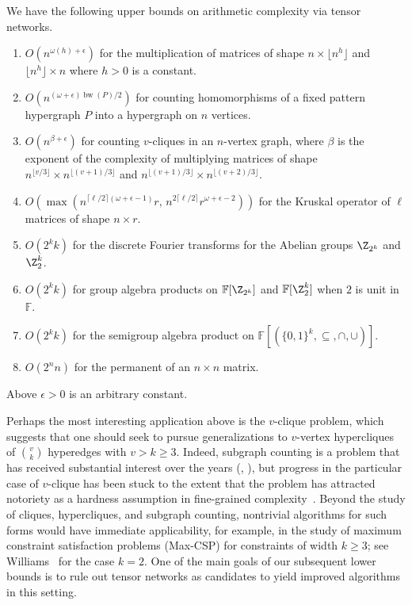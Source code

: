 \documentclass{toc}
\DeclareMathOperator{\bw}{bw}
\newcommand{\F}{\ensuremath{\mathbb{F}}}
\begin{document}
\begin{theorem}
  \label{thm:upper bounds}
  We have the following upper bounds on arithmetic complexity via tensor
networks. %
  \begin{enumerate}
  \item $O(n^{\omega(h) + \epsilon})$ for the multiplication of matrices of shape $n \times \lfloor n^h \rfloor$ and $\lfloor n^h \rfloor \times n$
where $h > 0$ is a constant. %
%
  \item $O(n^{(\omega+\epsilon) \bw(P)/2})$ for counting homomorphisms of a fixed pattern hypergraph $P$ into a hypergraph on $n$ vertices.
  \item $O(n^{\beta + \epsilon})$ for counting $v$-cliques in an $n$-vertex graph, where $\beta$ is the exponent of the complexity of multiplying matrices of shape $n^{\lfloor v/3 \rfloor} \times n^{\lfloor (v+1)/3 \rfloor}$ and $n^{\lfloor (v+1)/3 \rfloor} \times n^{\lfloor (v+2)/3 \rfloor}$.
  \item $O(\max(n^{\lceil\ell/2\rceil(\omega+\epsilon-1)}r,\,n^{2\lceil\ell/2\rceil}r^{\omega+\epsilon-2}))$ for the Kruskal operator of $\ell$ matrices of shape $n\times r$.
  \item $O(2^k k)$ for the discrete Fourier transforms for the Abelian groups $\Z_{2^k}$ and $\Z_2^k$.
  \item $O(2^kk)$ for group algebra products on $\F[\Z_{2^k}]$ and $\F[\Z_2^k]$ when $2$ is unit in $\F$.
  \item $O(2^kk)$ for the semigroup algebra product on $\F[(\{0,1\}^k,\subseteq,\cap,\cup)]$.
  \item $O(2^n n)$ for the permanent of an $n \times n$ matrix.
  \end{enumerate}
Above $\epsilon>0$ is an arbitrary constant.
\end{theorem}


Perhaps the most interesting application above
is the $v$-clique problem, which suggests that one should seek to
pursue generalizations to $v$-vertex hypercliques of
$\binom{v}{k}$ hyperedges with $v>k\geq 3$.
Indeed, subgraph counting is a problem that has received substantial
interest over the years (\eg, \cite{%
ItaiR1978,%
Nesetril1985,%
AlonYZ1997,%
AlonG2010,%
EisenbrandG2004,%
BjorklundHKK2009,%
BjorklundKK2014,%
WilliamsWWY15,%
WilliamsW2013,%
FominLRSR2012,%
FloderusKLL2015,%
Olariu1988,%
KloksKM2000,%
CurticapeanDM2017}), but progress in the particular case of $v$-clique
has been stuck to the extent that the problem has attracted notoriety as
a hardness assumption in fine-grained
complexity~\cite{AbboudBBK2017,AbboudBW15a}.
Beyond the study of cliques, hypercliques, and subgraph counting, nontrivial
algorithms for such forms would have immediate applicability, for example,
in the study of maximum constraint satisfaction problems (Max-CSP) for
constraints of width $k\geq 3$; 
see Williams~\cite{Williams2005} %
for
the case $k=2$. One of the main goals of our subsequent lower bounds is
to rule out tensor networks as %
candidates  %
to yield improved algorithms in this setting.
\end{document}
